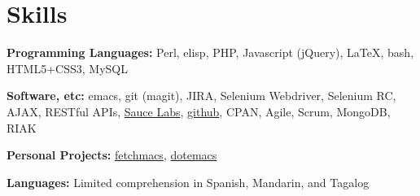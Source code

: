 \section{Skills}
%
\begin{myitem}
\item[] \textbf{Programming Languages:} Perl, elisp, PHP, Javascript (jQuery), \LaTeX, bash, HTML5+CSS3, MySQL
\item[] \textbf{Software, etc:} emacs, git (magit), JIRA, Selenium Webdriver, Selenium RC, AJAX, RESTful APIs, \href{http://www.saucelabs.com}{Sauce Labs}, \href{http://www.github.com/gempesaw}{github}, CPAN, Agile, Scrum, MongoDB, RIAK
\item[] \textbf{Personal Projects:} \href{http://github.com/gempesaw/fetchmacs}{fetchmacs}, \href{http://github.com/gempesaw/dotemacs}{dotemacs}
\item[] \textbf{Languages:} Limited comprehension in Spanish, Mandarin, and Tagalog
\end{myitem}
